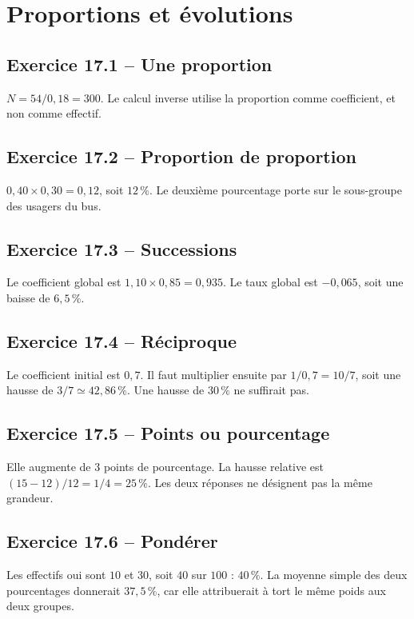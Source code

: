 \chapter{Proportions et évolutions}
\section*{Exercice 17.1 -- Une proportion}
$N=54/0{,}18=300$. Le calcul inverse utilise la proportion comme coefficient, et non comme effectif.

\section*{Exercice 17.2 -- Proportion de proportion}
$0{,}40\times0{,}30=0{,}12$, soit $12\,\%$. Le deuxième pourcentage porte sur le sous-groupe des usagers du bus.

\section*{Exercice 17.3 -- Successions}
Le coefficient global est $1{,}10\times0{,}85=0{,}935$. Le taux global est $-0{,}065$, soit une baisse de $6{,}5\,\%$.

\section*{Exercice 17.4 -- Réciproque}
Le coefficient initial est $0{,}7$. Il faut multiplier ensuite par $1/0{,}7=10/7$, soit une hausse de $3/7\simeq42{,}86\,\%$. Une hausse de $30\,\%$ ne suffirait pas.

\section*{Exercice 17.5 -- Points ou pourcentage}
Elle augmente de $3$ points de pourcentage. La hausse relative est $(15-12)/12=1/4=25\,\%$. Les deux réponses ne désignent pas la même grandeur.

\section*{Exercice 17.6 -- Pondérer}
Les effectifs oui sont $10$ et $30$, soit $40$ sur $100$ : $40\,\%$. La moyenne simple des deux pourcentages donnerait $37{,}5\,\%$, car elle attribuerait à tort le même poids aux deux groupes.

